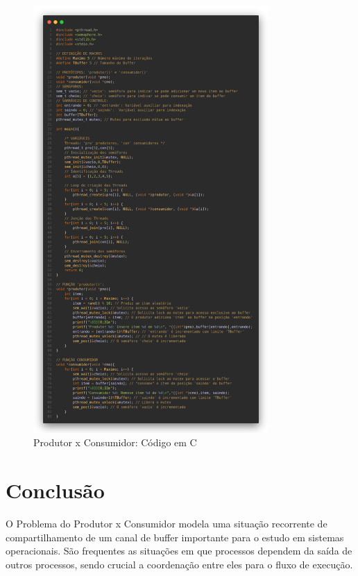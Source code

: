 \documentclass[
	12pt,				%
	openright,			%
	oneside,			%
	a4paper,			%
	chapter=TITLE,		%
	english,			%
	french,				%
	spanish,			%
	brazil				%
	]{abntex2}
\theoremstyle{definition}
\begin{document}
\begin{figure}[h]
    \centering
    \includegraphics[width=0.8\textwidth]{imagens/prod_cons.png}
    \caption{Produtor x Consumidor: Código em C}
    \label{fig:prod_cons}
\end{figure}

\clearpage
\section{Conclusão}

O Problema do Produtor x Consumidor modela uma situação recorrente de compartilhamento de um canal de buffer importante para o estudo em sistemas operacionais. São frequentes as situações em que processos dependem da saída de outros processos, sendo crucial a coordenação entre eles para o fluxo de execução.
\end{document}
